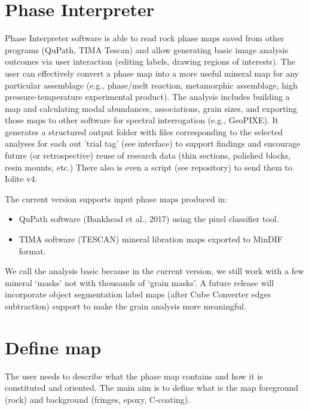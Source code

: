 \section{Phase Interpreter}
\label{chap:repo3}
	
	Phase Interpreter software is able to read rock phase maps saved from other programs (QuPath, TIMA Tescan) and allow generating basic image analysis outcomes via user interaction (editing labels, drawing regions of interests). The user can effectively convert a phase map into a more useful mineral map for any particular assemblage (e.g., phase/melt reaction, metamorphic assemblage, high pressure-temperature experimental product). The analysis includes building a map and calculating modal abundances, associations, grain sizes, and exporting those maps to other software for spectral interrogation (e.g., GeoPIXE). It generates a structured output folder with files corresponding to the selected analyses for each out 'trial tag' (see interface) to support findings and encourage future (or retrospective) reuse of research data (thin sections, polished blocks, resin mounts, etc.) There also is even a script (see repository) to send them to Iolite v4. 
	
	The current version supports input phase maps produced in:
	\begin{itemize}		
		\item QuPath software (Bankhead et al., 2017) using the pixel classifier tool. 		
		\item TIMA software (TESCAN) mineral libration maps exported to MinDIF format. 
	\end{itemize}
	
	We call the analysis basic because in the current version, we still work with a few mineral `masks' not with thousands of `grain masks'. A future release will incorporate object segmentation label maps (after Cube Converter edges subtraction) support to make the grain analysis more meaningful. 
	
	\section{Define map}
	
	The user needs to describe what the phase map contains and how it is constituted and oriented. The main aim is to define what is the map foreground (rock) and background (fringes, epoxy, C-coating).
	
